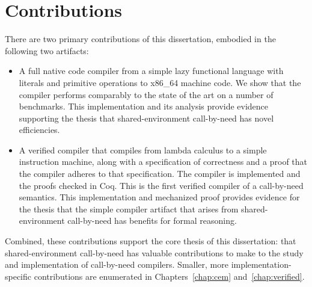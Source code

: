 \section{Contributions}

There are two primary contributions of this dissertation, embodied in the
following two artifacts:

\begin{itemize}
\item A full native code compiler from a simple lazy functional language with
literals and primitive operations to x86\_64 machine code. We show that the
compiler performs comparably to the state of the art on a number of benchmarks.
This implementation and its analysis provide evidence supporting the thesis that
shared-environment call-by-need has novel efficiencies.

\item A verified compiler that compiles from lambda calculus to a simple
instruction machine, along with a specification of correctness and a proof that
the compiler adheres to that specification. The compiler is implemented and the
proofs checked in Coq. This is the first verified compiler of a call-by-need
semantics. This implementation and mechanized proof provides evidence for the
thesis that the simple compiler artifact that arises from shared-environment
call-by-need has benefits for formal reasoning.
\end{itemize}

Combined, these contributions support the core thesis of this dissertation: that
shared-environment call-by-need has valuable contributions to make to the study
and implementation of call-by-need compilers. Smaller, more
implementation-specific contributions are enumerated in Chapters~\ref{chap:cem}
and~\ref{chap:verified}. 
